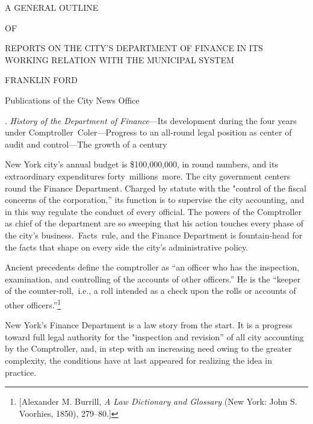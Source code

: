 \documentclass[openany,nobib]{tufte-book}
\begin{document}
\vspace{0.5in}

\begin{center}

{\LARGE A GENERAL OUTLINE}

\vspace{0.15in}

{\Large OF}

\vspace{0.15in} {\LARGE REPORTS ON THE CITY'S DEPARTMENT OF
FINANCE IN ITS WORKING RELATION WITH THE MUNICIPAL
SYSTEM}

\vspace{0.25in}

{\Large FRANKLIN FORD}

\vspace{0.25in}

{\LARGE Publications of the City News Office}

\end{center}

\vspace{0.35in}

. \emph{History of the Department of Finance}---Its development during
the four years under Comptroller~Coler---Progress to an all-round legal
position as center of audit and control---The growth of a century~~

New York city's annual budget is \$100,000,000, in round numbers, and
its extraordinary expenditures forty~millions~more. The city government
centers round the Finance Department. Charged by statute with the
"control of the fiscal concerns of the corporation,'' its function is to
supervise the city accounting, and in this way regulate the conduct of
every official. The powers of the Comptroller as chief of the department
are so sweeping that his action touches every phase of the city's
business.~Facts~rule, and the Finance Department is fountain-head for
the facts that shape on every side the city's administrative policy.~

Ancient precedents define the comptroller as ``an officer who has the
inspection, examination, and controlling of the accounts of other
officers.'' He is the ``keeper of the counter-roll,~i.e., a roll
intended as a check upon the rolls or accounts of other
officers.''\footnote{{[}Alexander M. Burrill, \emph{A Law Dictionary and
  Glossary} (New York: John S. Voorhies, 1850), 279--80.{]}}~

New York's Finance Department is a law story from the start. It is a
progress toward full legal authority for the "inspection and revision''
of all city accounting by the Comptroller, and, in step with an
increasing need owing to the greater complexity, the conditions have at
last appeared for realizing the idea in practice.~
\end{document}

